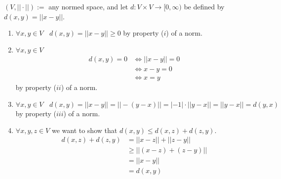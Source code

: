 \begin{example}
    $(V, || \cdot ||):=$ any normed space, and let $d: V \times V \rightarrow [0, \infty)$ be defined by $d(x,y) = ||x - y||$.
    \begin{enumerate}[$(i)$]
        \item $\forall x,y \in V ~~~~ d(x,y) = ||x - y|| \geq 0$ by property ($i$) of a norm.
        \item $\forall x,y \in V$ ~~~~\begin{align*}d(x,y) = 0 &\iff ||x-y|| = 0 \\ &\iff x-y = 0 \\ &\iff x = y\end{align*} by property ($ii$) of a norm.
        \item $\forall x,y \in V ~~~~ d(x,y)= ||x - y|| = ||-(y-x)|| = |-1| \cdot ||y -x || = ||y - x|| = d(y,x)$ by property ($iii$) of a norm.
        \item $\forall x,y,z \in V$ we want to show that $d(x,y) \leq d(x,z) + d(z,y)$. 
        \begin{align*} d(x,z) + d(z,y) &= ||x-z|| + ||z-y|| \\ &\geq ||(x-z) + (z-y)|| \\ &= ||x-y|| \\ &= d(x,y)\end{align*}
    \end{enumerate}
\end{example}

